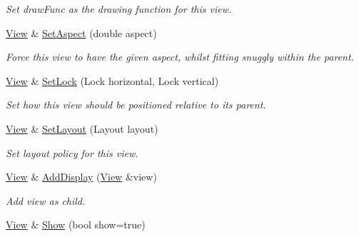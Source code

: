 \begin{DoxyCompactItemize}
\begin{DoxyCompactList}\small\item\em Set draw\+Func as the drawing function for this view. \end{DoxyCompactList}\item 
\hyperlink{structpangolin_1_1_view}{View} \& \hyperlink{structpangolin_1_1_view_a21e7cd9473d755add53a6d5a943f70a4}{Set\+Aspect} (double aspect)
\begin{DoxyCompactList}\small\item\em Force this view to have the given aspect, whilst fitting snuggly within the parent. \end{DoxyCompactList}\item 
\hyperlink{structpangolin_1_1_view}{View} \& \hyperlink{structpangolin_1_1_view_a8720202e284cfa262d2e2bac2a793dd0}{Set\+Lock} (Lock horizontal, Lock vertical)\hypertarget{structpangolin_1_1_view_a8720202e284cfa262d2e2bac2a793dd0}{}\label{structpangolin_1_1_view_a8720202e284cfa262d2e2bac2a793dd0}

\begin{DoxyCompactList}\small\item\em Set how this view should be positioned relative to its parent. \end{DoxyCompactList}\item 
\hyperlink{structpangolin_1_1_view}{View} \& \hyperlink{structpangolin_1_1_view_ab3c23fabb44643b46e30ac1e101e0aec}{Set\+Layout} (Layout layout)\hypertarget{structpangolin_1_1_view_ab3c23fabb44643b46e30ac1e101e0aec}{}\label{structpangolin_1_1_view_ab3c23fabb44643b46e30ac1e101e0aec}

\begin{DoxyCompactList}\small\item\em Set layout policy for this view. \end{DoxyCompactList}\item 
\hyperlink{structpangolin_1_1_view}{View} \& \hyperlink{structpangolin_1_1_view_ad6a09c71ae000f5e42197ba2e7dba00d}{Add\+Display} (\hyperlink{structpangolin_1_1_view}{View} \&view)\hypertarget{structpangolin_1_1_view_ad6a09c71ae000f5e42197ba2e7dba00d}{}\label{structpangolin_1_1_view_ad6a09c71ae000f5e42197ba2e7dba00d}

\begin{DoxyCompactList}\small\item\em Add view as child. \end{DoxyCompactList}\item 
\hyperlink{structpangolin_1_1_view}{View} \& \hyperlink{structpangolin_1_1_view_a764258b46cb0915665f3328e06590f9b}{Show} (bool show=true)\hypertarget{structpangolin_1_1_view_a764258b46cb0915665f3328e06590f9b}{}\label{structpangolin_1_1_view_a764258b46cb0915665f3328e06590f9b}


\end{DoxyCompactItemize}
